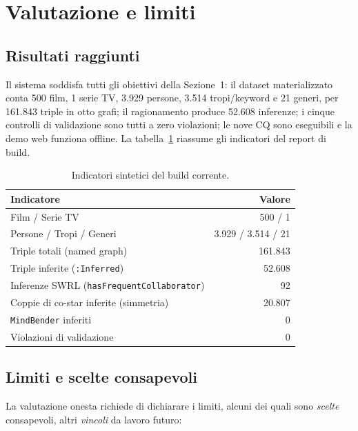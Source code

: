 \documentclass[a4paper,11pt]{article}
\newcommand{\code}[1]{\texttt{#1}}
\begin{document}
\section{Valutazione e limiti}\label{sec:valutazione}

\subsection{Risultati raggiunti}

Il sistema soddisfa tutti gli obiettivi della Sezione~1: il dataset
materializzato conta 500 film, 1 serie TV, 3.929 persone, 3.514
tropi/keyword e 21 generi, per 161.843 triple in otto grafi; il
ragionamento produce 52.608 inferenze; i cinque controlli di validazione
sono tutti a zero violazioni; le nove CQ sono eseguibili e la demo web
funziona offline. La tabella~\ref{tab:risultati} riassume gli indicatori
del report di build.

\begin{table}[ht]
\centering
\caption{Indicatori sintetici del build corrente.}
\label{tab:risultati}
\small
\begin{tabular}{@{}lr@{}}
\toprule
\textbf{Indicatore} & \textbf{Valore} \\
\midrule
Film / Serie TV & 500 / 1 \\
Persone / Tropi / Generi & 3.929 / 3.514 / 21 \\
Triple totali (named graph) & 161.843 \\
Triple inferite (\code{:Inferred}) & 52.608 \\
Inferenze SWRL (\code{hasFrequentCollaborator}) & 92 \\
Coppie di co-star inferite (simmetria) & 20.807 \\
\code{MindBender} inferiti & 0 \\
Violazioni di validazione & 0 \\
\bottomrule
\end{tabular}
\end{table}

\subsection{Limiti e scelte consapevoli}

La valutazione onesta richiede di dichiarare i limiti, alcuni dei quali
sono \emph{scelte} consapevoli, altri \emph{vincoli} da lavoro futuro:
\end{document}
